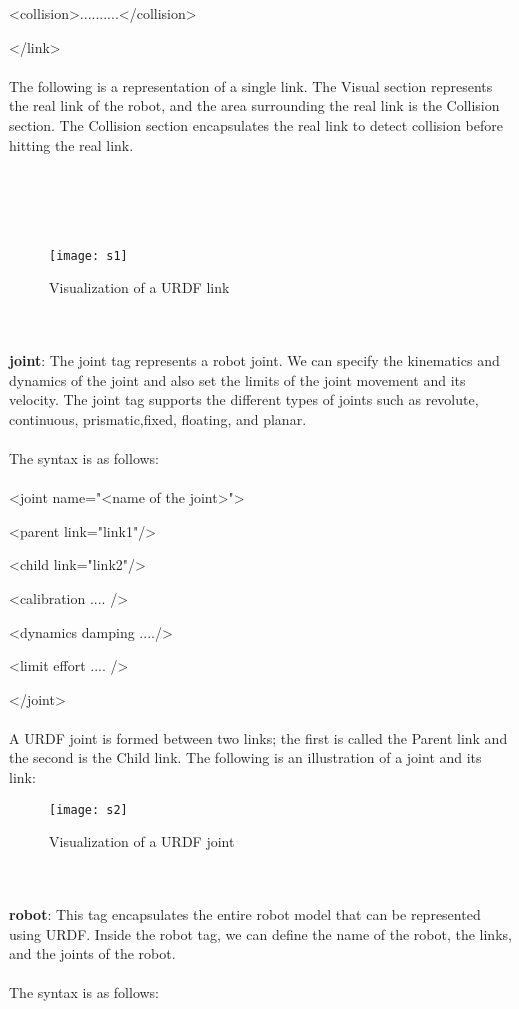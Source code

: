 \documentclass[a4paper]{article}
\begin{document}
  <collision>..........</collision>

</link>
\\\\The following is a representation of a single link. The Visual section represents 
the real link of the robot, and the area surrounding the real link is the Collision 
section. The Collision section encapsulates the real link to detect collision before 
hitting the real link.\\\\\\\\\\
\begin{figure}[h]
	\centering
	\texttt{[image: s1]}
	\caption{Visualization of a URDF link}
	\label{fig:s1}
\end{figure}
\\\\\textbf{joint}: The joint tag represents a robot joint. We can specify the kinematics and dynamics of the joint and also set the limits of the joint movement and its velocity. The joint tag supports the different types of joints such as revolute, continuous, prismatic,fixed, floating, and planar.
\\\\The syntax is as follows:\\\\

<joint name="<name of the joint>">

  <parent link="link1"/>

  <child link="link2"/>

  <calibration .... />

  <dynamics damping ..../>

  <limit effort .... />

</joint>
\\\\A URDF joint is formed between two links; the first is called the Parent link and the second is the Child link. The following is an illustration of a joint and its link:\\
\begin{figure}[h]
	\centering
	\texttt{[image: s2]}
	\caption{Visualization of a URDF joint}
	\label{fig:s2}
\end{figure}
\\\\\textbf{robot}: This tag encapsulates the entire robot model that can be represented using URDF. Inside the robot tag, we can define the name of the robot, the links, and the joints of the robot.
\\\\The syntax is as follows:\\
\end{document}
